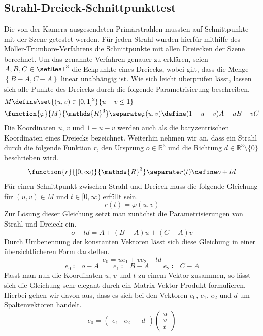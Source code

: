\documentclass[crop=false]{standalone}
\begin{document}
    \subsection{Strahl-Dreieck-Schnittpunkttest} %
    \label{sub:strahl_dreieck_schnittpunkttest}
      Die von der Kamera ausgesendeten Primärstrahlen mussten auf Schnittpunkte mit der Szene getestet werden.
      Für jeden Strahl wurden hierfür mithilfe des Möller-Trumbore-Verfahrens die Schnittpunkte mit allen Dreiecken der Szene berechnet.
      Um das genannte Verfahren genauer zu erklären, seien $A,B,C\in \setReal^3$ die Eckpunkte eines Dreiecks, wobei gilt, dass die Menge $\left\{ B-A,C-A \right\}$ linear unabhängig ist.
      Wie sich leicht überprüfen lässt, lassen sich alle Punkte des Dreiecks durch die folgende Parametrisierung beschreiben.
      \begin{align*}
        &M \define \set{ (u,v)\in [0,1]^2 }{ u+v \leq 1 } \\
        &\function{\varphi}{M}{\mathds{R}^3}
        \separate
        \varphi(u,v)\define (1-u-v)A + uB + vC
      \end{align*}
      Die Koordinaten $u$, $v$ und $1-u-v$ werden auch als die baryzentrischen Koordinaten eines Dreiecks bezeichnet.
      Weiterhin nehmen wir an, dass ein Strahl durch die folgende Funktion $r$, den Ursprung $o\in\mathds{R}^3$ und die Richtung $d\in\mathds{R}^3\setminus\{0\}$ beschrieben wird.
      \[
        \function{r}{[0,\infty)}{\mathds{R}^3}
        \separate
        r(t) \define o + td
      \]
      Für einen Schnittpunkt zwischen Strahl und Dreieck muss die folgende Gleichung für $(u,v)\in M$ und $t\in[0,\infty)$ erfüllt sein.
      \[
        r(t) = φ(u,v)
      \]
      Zur Lösung dieser Gleichung setzt man zunächst die Parametrisierungen von Strahl und Dreieck ein.
      \[
        o + td = A + (B-A)u + (C-A)v
      \]
      Durch Umbenennung der konstanten Vektoren lässt sich diese Gleichung in einer übersichtlicheren Form darstellen.
      \[
        e_0 = ue_1 + ve_2 - td
      \]
      \[
        e_0 \coloneqq o - A
        \qquad
        e_1 \coloneqq B-A
        \qquad
        e_2 \coloneqq C-A
      \]
      Fasst man nun die Koordinaten $u$, $v$ und $t$ zu einem Vektor zusammen, so lässt sich die Gleichung sehr elegant durch ein Matrix-Vektor-Produkt formulieren.
      Hierbei gehen wir davon aus, dass es sich bei den Vektoren $e_0$, $e_1$, $e_2$ und $d$ um Spaltenvektoren handelt.
      \[
        e_0 =
        \begin{pmatrix}
          e_1 &
          e_2 &
          -d
        \end{pmatrix}
        \begin{pmatrix}
          u \\
          v \\
          t
        \end{pmatrix}
      \]
\end{document}

